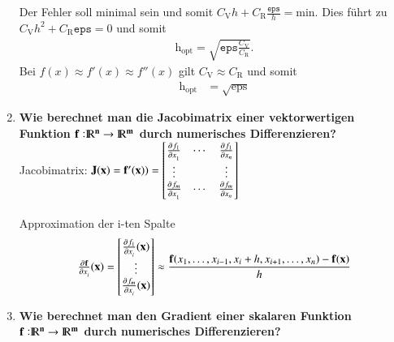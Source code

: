 \begin{enumerate}
			Der Fehler soll minimal sein und somit \(C_\text{V} h + C_\text{R} \frac{\texttt{eps}}{h}=\text{min}.\) Dies führt zu \(C_\text{V} h^2 + C_\text{R}\texttt{eps}=0\) und somit
			\begin{align*}
				\text{h}_\text{opt}=\sqrt{\texttt{eps}\frac{C_\text{V}}{C_\text{R}}}.
			\end{align*}			 
			Bei \(f(x)\approx f'(x) \approx f''(x)\) gilt \(C_\text{V} \approx C_\text{R}\) und somit
			\begin{align*}
				\text{h}_\text{opt}&=\sqrt{\text{eps}}
			\end{align*}
		\item \textbf{Wie berechnet man die Jacobimatrix einer vektorwertigen Funktion \(\mathbf{f:}{\rm I\!R}\mathbf{^n} \rightarrow {\rm I\!R}\mathbf{^m}\) durch numerisches Differenzieren?}\\
			Jacobimatrix: \(\mathbf{J(x)}=\mathbf{f'(x)})=\begin{bmatrix}
				\pd{f_1}{x_1} & \cdots & \pd{f_1}{x_n} \\
				\vdots &  & \vdots \\
				\pd{f_{m}}{x_1} & \cdots & \pd{f_m}{x_n}
			\end{bmatrix}\) \\\\
			Approximation der i-ten Spalte
			\begin{align*}
				\pd{\mathbf{f}}{x_i}(\mathbf{x})=
					\begin{bmatrix}
						\pd{f_1}{x_i}(\mathbf{x}) \\
						\vdots \\
						\pd{f_m}{x_i}(\mathbf{x})
					\end{bmatrix}
					\approx \frac{\mathbf{f}(x_1,\dots,x_{i-1},x_i+h,x_{i+1},\dots,x_n)-\mathbf{f(x)}}{h}
			\end{align*}
		\item \textbf{Wie berechnet man den Gradient einer skalaren Funktion \(\mathbf{f:}{\rm I\!R}\mathbf{^n} \rightarrow {\rm I\!R}\mathbf{^m}\) durch numerisches Differenzieren?}\\
	\end{enumerate}